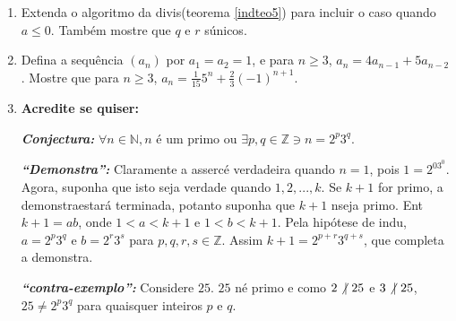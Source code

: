 \begin{enumerate}[{\bf 1.}]
\item Extenda o algoritmo da divis\ao (teorema \ref{indteo5}) para incluir o caso quando $a\leq 0$. Tamb\'em mostre que $q$ e $r$ s\ao \'unicos.

\item Defina a sequ\^encia $(a_n)$ por $a_1=a_2=1$, e para $n\geq 3$, $a_n=4a_{n-1}+5a_{n-2}$. Mostre que para $n\geq 3$, $a_n=\frac{1}{15}5^n+\frac{2}{3}(-1)^{n+1}$.

\item {\bf Acredite se quiser:}  

\noindent \textit{\textbf{Conjectura:}} $\forall n\in\mathbb{N}, n$ \'e um primo ou $\exists p,q\in\mathbb{Z} \ni n=2^p3^q$. 

\noindent \textit{\textbf{``Demonstra\caoi'':}} Claramente a asserc\ao \'e verdadeira quando $n=1$, pois $1=2^03^0$. Agora, suponha que isto seja verdade quando $1,2,...,k$. Se $k+1$ for primo, a demonstra\cao estar\'a terminada, potanto suponha que $k+1$ n\ao seja primo. Ent\ao $k+1=ab$, onde $1<a<k+1$ e $1<b<k+1$. Pela hip\'otese de indu\caoi, $a=2^p3^q$ e $b=2^r3^s$ para $p,q,r,s\in\mathbb{Z}$. Assim $k+1=2^{p+r}3^{q+s}$, que completa a demonstra\caoi.

\noindent \textit{\textbf{``contra-exemplo'':}} Considere $25$. $25$ n\ao \'e primo e como $2\not|\textrm{ } 25$ e $3\not|\textrm{ } 25$, $25\neq 2^p3^q$ para quaisquer inteiros $p$ e $q$.
\end{enumerate}

